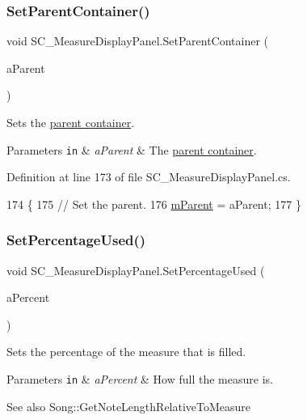 \subsubsection{\texorpdfstring{Set\+Parent\+Container()}{SetParentContainer()}}
{\footnotesize\ttfamily void S\+C\+\_\+\+Measure\+Display\+Panel.\+Set\+Parent\+Container (\begin{DoxyParamCaption}\item[{\hyperlink{class_s_c___note_display_container}{S\+C\+\_\+\+Note\+Display\+Container}}]{a\+Parent }\end{DoxyParamCaption})}



Sets the \hyperlink{group___doc_s_c___n_d_c}{parent container}. 


\begin{DoxyParams}[1]{Parameters}
\mbox{\tt in}  & {\em a\+Parent} & The \hyperlink{group___doc_s_c___n_d_c}{parent container}. \\
\hline
\end{DoxyParams}


Definition at line 173 of file S\+C\+\_\+\+Measure\+Display\+Panel.\+cs.


\begin{DoxyCode}
174     \{
175         \textcolor{comment}{// Set the parent.}
176         \hyperlink{group___s_c___m_d_p_priv_var_ga6f22ae359dd68605a8b2fd961ced96b5}{mParent} = aParent;
177     \}
\end{DoxyCode}
\mbox{\label{group___s_c___m_d_p_pub_func_gab8a32b1ba282d441cb1325d29f53dd1c}} 
\subsubsection{\texorpdfstring{Set\+Percentage\+Used()}{SetPercentageUsed()}}
{\footnotesize\ttfamily void S\+C\+\_\+\+Measure\+Display\+Panel.\+Set\+Percentage\+Used (\begin{DoxyParamCaption}\item[{float}]{a\+Percent }\end{DoxyParamCaption})}



Sets the percentage of the measure that is filled. 


\begin{DoxyParams}[1]{Parameters}
\mbox{\tt in}  & {\em a\+Percent} & How full the measure is.\\
\hline
\end{DoxyParams}
\begin{DoxySeeAlso}{See also}
Song\+::\+Get\+Note\+Length\+Relative\+To\+Measure 
\end{DoxySeeAlso}


